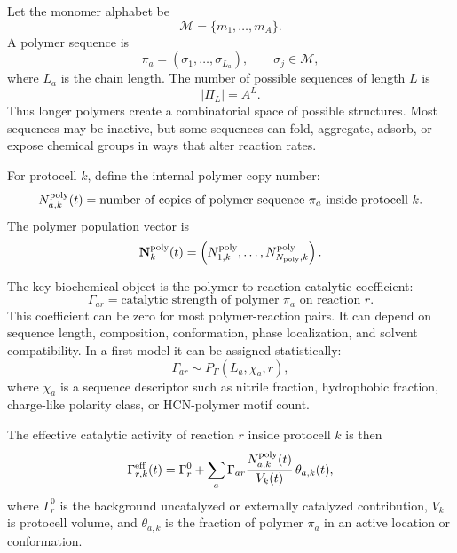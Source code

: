 \documentclass[11pt]{article}
\begin{document}
Let the monomer alphabet be
\begin{equation}
\mathcal{M}=\{m_1,\ldots,m_A\}.
\end{equation}
A polymer sequence is
\begin{equation}
\pi_a=(\sigma_1,\ldots,\sigma_{L_a}),
\qquad
\sigma_j\in\mathcal{M},
\end{equation}
where $L_a$ is the chain length. The number of possible sequences of length $L$ is
\begin{equation}
|\Pi_L|=A^L.
\end{equation}
Thus longer polymers create a combinatorial space of possible structures. Most sequences may be inactive, but some sequences can fold, aggregate, adsorb, or expose chemical groups in ways that alter reaction rates.

For protocell $k$, define the internal polymer copy number:
\begin{equation}
N^{\rm poly}_{a,k}(t)
=
\text{number of copies of polymer sequence }\pi_a
\text{ inside protocell }k.
\end{equation}
The polymer population vector is
\begin{equation}
\mathbf{N}^{\rm poly}_k(t)
=
\left(
N^{\rm poly}_{1,k},
\ldots,
N^{\rm poly}_{N_{\rm poly},k}
\right).
\end{equation}

The key biochemical object is the polymer-to-reaction catalytic coefficient:
\begin{equation}
\Gamma_{ar}
=
\text{catalytic strength of polymer }\pi_a
\text{ on reaction }r.
\end{equation}
This coefficient can be zero for most polymer-reaction pairs. It can depend on sequence length, composition, conformation, phase localization, and solvent compatibility. In a first model it can be assigned statistically:
\begin{equation}
\Gamma_{ar}\sim P_\Gamma(L_a,\chi_a,r),
\end{equation}
where $\chi_a$ is a sequence descriptor such as nitrile fraction, hydrophobic fraction, charge-like polarity class, or HCN-polymer motif count.

The effective catalytic activity of reaction $r$ inside protocell $k$ is then
\begin{equation}
\Gamma^{\rm eff}_{r,k}(t)
=
\Gamma^0_r
+
\sum_a
\Gamma_{ar}
\frac{N^{\rm poly}_{a,k}(t)}{V_k(t)}
\,\theta_{a,k}(t),
\end{equation}
where $\Gamma^0_r$ is the background uncatalyzed or externally catalyzed contribution, $V_k$ is protocell volume, and $\theta_{a,k}$ is the fraction of polymer $\pi_a$ in an active location or conformation.
\end{document}
